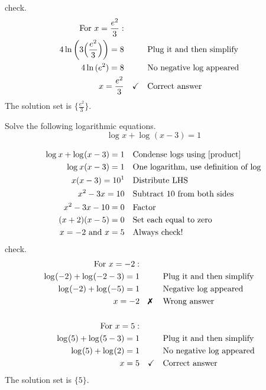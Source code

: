 check.	
	\begin{align*}
		\text{For}\,\, x=\frac{e^2}{3}:  \\
		4\ln{\biggl(3\Bigl(\frac{e^2}{3}\Bigr)\biggr)} =8& 		&&\text{Plug it and then simplify} \\
		4\ln{(e^2)} =8&				&&\text{No negative log appeared}\\
		x=\frac{e^2}{3}& \quad \checkmark		&&\text{Correct answer}
	\end{align*}
The solution set is $\bigl\{\frac{e^2}{3}\bigr\}$.
\begin{exa}
    Solve the following logarithmic equations. 
    \[
                \log_{}x+\log_{}(x-3) =1
    \]
\end{exa}
	\begin{align*}
		\log_{}x+\log_{}(x-3) =1&	&&\text{Condense logs using \eqref{product}}\\
		\log_{}x(x-3) =1&			&&\text{One logarithm, use definition of log}\\
		x(x-3)= 10^1&				&&\text{Distribute LHS}\\
		x^2-3x=10&                  &&\text{Subtract 10 from both sides} \\
		x^2-3x-10 =0& 				&&\text{Factor}\\
		(x+2)(x-5) =0&					&&\text{Set each equal to zero}\\
		x=-2\,\, \text{and}\,\, x=5&	&&\text{Always check!} 
	\end{align*}
check.	
	\begin{align*}
		\text{For}\,\, x=-2:  \\
		\log_{}(-2)+\log_{}(-2-3) =1& 		&&\text{Plug it and then simplify} \\
		\log_{}(-2)+\log_{}(-5) =1& 				&&\text{Negative log appeared}\\
		x=-2& \quad \xmark		&&\text{Wrong answer}\\
		&&&\\
		\text{For}\,\, x=5:  \\
		\log_{}(5)+\log_{}(5-3) =1& 		&&\text{Plug it and then simplify} \\
		\log_{}(5)+\log_{}(2) =1 &		&&\text{No negative log appeared}\\
		x=5& \quad \checkmark		&&\text{Correct answer}\\	
	\end{align*}
The solution set is $\{5\}$.
